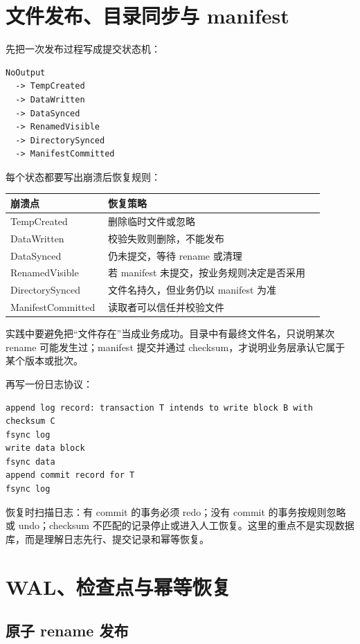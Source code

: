 \section{文件发布、目录同步与 manifest}

先把一次发布过程写成提交状态机：

\begin{lstlisting}
NoOutput
  -> TempCreated
  -> DataWritten
  -> DataSynced
  -> RenamedVisible
  -> DirectorySynced
  -> ManifestCommitted
\end{lstlisting}

每个状态都要写出崩溃后恢复规则：

\begin{longtable}{p{0.24\linewidth}p{0.66\linewidth}}
\toprule
崩溃点 & 恢复策略 \\
\midrule
TempCreated & 删除临时文件或忽略 \\
DataWritten & 校验失败则删除，不能发布 \\
DataSynced & 仍未提交，等待 rename 或清理 \\
RenamedVisible & 若 manifest 未提交，按业务规则决定是否采用 \\
DirectorySynced & 文件名持久，但业务仍以 manifest 为准 \\
ManifestCommitted & 读取者可以信任并校验文件 \\
\bottomrule
\end{longtable}

实践中要避免把“文件存在”当成业务成功。目录中有最终文件名，只说明某次 rename 可能发生过；manifest 提交并通过 checksum，才说明业务层承认它属于某个版本或批次。

再写一份日志协议：

\begin{lstlisting}
append log record: transaction T intends to write block B with checksum C
fsync log
write data block
fsync data
append commit record for T
fsync log
\end{lstlisting}

恢复时扫描日志：有 commit 的事务必须 redo；没有 commit 的事务按规则忽略或 undo；checksum 不匹配的记录停止或进入人工恢复。这里的重点不是实现数据库，而是理解日志先行、提交记录和幂等恢复。

\section{WAL、检查点与幂等恢复}

\subsection{原子 rename 发布}

